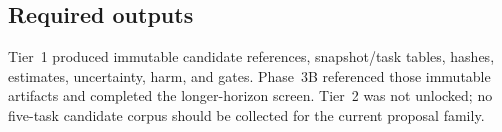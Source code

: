 \subsection{Required outputs}

\enlargethispage{\baselineskip}
Tier~1 produced immutable candidate references, snapshot/task tables, hashes, estimates, uncertainty, harm, and gates. Phase~3B referenced those immutable artifacts and completed the longer-horizon screen. Tier~2 was not unlocked; no five-task candidate corpus should be collected for the current proposal family.
